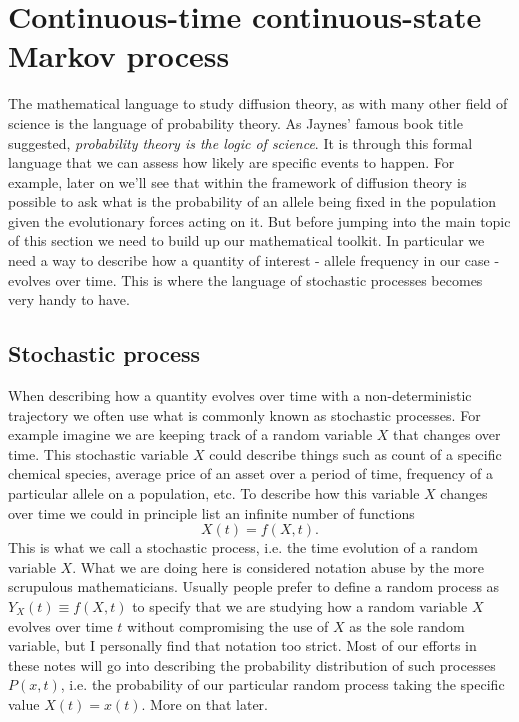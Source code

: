 \section{Continuous-time continuous-state Markov process}

The mathematical language to study diffusion theory, as with many other field
of science is the language of probability theory. As Jaynes' famous book title
suggested, \textit{probability theory is the logic of science}. It is through
this formal language that we can assess how likely are specific events to
happen. For example, later on we'll see that within the framework of diffusion
theory is possible to ask what is the probability of an allele being fixed in
the population given the evolutionary forces acting on it. But before jumping
into the main topic of this section we need to build up our mathematical
toolkit. In particular we need a way to describe how a quantity of interest -
allele frequency in our case - evolves over time. This is where the language of
stochastic processes becomes very handy to have.

\subsection{Stochastic process}

When describing how a quantity evolves over time with a non-deterministic
trajectory we often use what is commonly known as stochastic processes. For
example imagine we are keeping track of a random variable $X$ that changes over
time. This stochastic variable $X$ could describe things such as count of a
specific chemical species, average price of an asset over a period of time,
frequency of a particular allele on a population, etc. To describe how this
variable $X$ changes over time we could in principle list an infinite number of
functions
\begin{equation}
  X(t) = f(X, t).
\end{equation}
This is what we call a stochastic process, i.e. the time evolution of a random
variable $X$. What we are doing here is considered notation abuse by the more
scrupulous mathematicians. Usually people prefer to define a random process as
$Y_X(t) \equiv f(X, t)$ to specify that we are studying how a random variable
$X$ evolves over time $t$ without compromising the use of $X$ as the sole
random variable, but I personally find that notation too strict. Most of our
efforts in these notes will go into describing the probability distribution of
such processes $P(x, t)$, i.e. the probability of our particular random process
taking the specific value $X(t) = x(t)$. More on that later.

